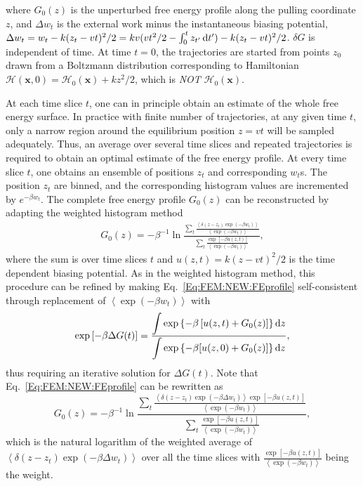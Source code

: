 where $G_0(z)$ is the unperturbed free energy profile along the pulling coordinate $z$, and $\Delta w_t$ is the external work minus the instantaneous biasing potential, $\Delta w_t=w_t-k(z_t-vt)^2/2=kv(vt^2/2-\int_0^t z_{t^\prime}\mathop{}\!\mathrm{d} t^\prime)-k(z_t-vt)^2/2$. %
$\delta G$ is independent of time.
At time $t=0$, the trajectories are started from points $z_0$ drawn from a Boltzmann distribution corresponding to Hamiltonian $\mathscr{H}(\mathbf{x},0)=\mathscr{H}_0(\mathbf{x})+kz^2/2$, which is \emph{NOT} $\mathscr{H}_0(\mathbf{x})$.

At each time slice $t$, one can in principle obtain an estimate of the whole free energy surface. In practice with finite number of trajectories, at any given time $t$, only a narrow region around the equilibrium position $z=vt$ will be sampled adequately. Thus, an average over several time slices and repeated trajectories is required to obtain an optimal estimate of the free energy profile. At every time slice $t$, one obtains an ensemble of positions $z_t$ and corresponding $w_t$s. The position $z_t$ are binned, and the corresponding histogram values are incremented by $e^{-\beta w_t}$. The complete free energy profile $G_0(z)$ can be reconstructed by adapting the weighted histogram method
\begin{align}
	G_0(z)=-\beta^{-1}\ln{\frac{\sum_t \frac{\left<\delta(z-z_t)\exp{(-\beta w_t)}\right>}{\left<\exp{(-\beta w_t)}\right>}}{\sum_t\frac{\exp{[-\beta u(z,t)]}}{\left<\exp{(-\beta w_t)}\right>}}},
	\label{Eq:FEM:NEW:FEprofile}
\end{align}
where the sum is over time slices $t$ and $u(z,t)=k(z-vt)^2/2$ is the time dependent biasing potential. As in the weighted histogram method, this procedure can be refined by making Eq.~\ref{Eq:FEM:NEW:FEprofile} self-consistent through replacement of $\left<\exp{(-\beta w_t)}\right>$ with
\begin{equation}
	\exp{[-\beta \Delta G(t)]}=\frac{\displaystyle\int \exp{\left\{-\beta \left[u(z,t)+G_0(z)\right]\right\}}\mathop{}\!\mathrm{d} z}{\displaystyle\int \exp{\left\{-\beta[u(z,0)+G_0(z)]\right\}\mathop{}\!\mathrm{d}z}},
\end{equation}
thus requiring an iterative solution for $\Delta G(t)$. Note that Eq.~\ref{Eq:FEM:NEW:FEprofile} can be rewritten as
\begin{equation}
	G_0(z)=-\beta^{-1}\ln{\frac{\sum_t \frac{\left<\delta(z-z_t)\exp{(-\beta \Delta w_t)}\right>\exp{[-\beta u(z,t)]}}{\left<\exp{(-\beta w_t)}\right>}}{\sum_t\frac{\exp{[-\beta u(z,t)]}}{\left<\exp{(-\beta w_t)}\right>}}},
\end{equation}
which is the natural logarithm of the weighted average of $\left<\delta(z-z_t)\exp{(-\beta \Delta w_t)}\right>$ over all the time slices with $\frac{\exp{[-\beta u(z,t)]}}{\left<\exp{(-\beta w_t)}\right>}$ being the weight.